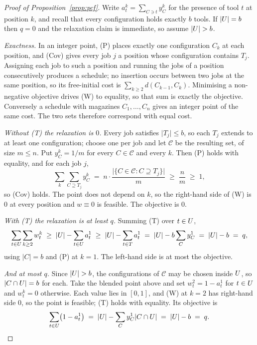 \begin{proof}[Proof of Proposition~\ref{prop:pcf}]
Write $a_t^{k}=\sum_{C\ni t}y_C^{k}$ for the presence of tool $t$ at position $k$, and
recall that every configuration holds exactly $b$ tools. If $\lvert U\rvert=b$ then
$q=0$ and the relaxation claim is immediate, so assume $\lvert U\rvert>b$.

\emph{Exactness.} In an integer point, (P) places exactly one configuration $C_k$ at
each position, and (Cov) gives every job $j$ a position whose configuration contains
$T_j$. Assigning each job to such a position and running the jobs of a position
consecutively produces a schedule; no insertion occurs between two jobs at the same
position, so its free-initial cost is $\sum_{k\ge2}d(C_{k-1},C_k)$. Minimising a
non-negative objective drives (W) to equality, so that sum is exactly the objective.
Conversely a schedule with magazines $C_1,\dots,C_n$ gives an integer point of the same
cost. The two sets therefore correspond with equal cost.

\emph{Without (T) the relaxation is $0$.} Every job satisfies $\lvert T_j\rvert\le b$,
so each $T_j$ extends to at least one configuration; choose one per job and let
$\mathcal{C}$ be the resulting set, of size $m\le n$. Put $y_C^{k}=1/m$ for every
$C\in\mathcal{C}$ and every $k$. Then (P) holds with equality, and for each job $j$,
\[
  \sum_{k}\sum_{C\supseteq T_j}y_C^{k}\;=\;n\cdot\frac{\lvert\{C\in\mathcal{C}:C\supseteq T_j\}\rvert}{m}\;\ge\;\frac{n}{m}\;\ge\;1,
\]
so (Cov) holds. The point does not depend on $k$, so the right-hand side of (W) is $0$
at every position and $w\equiv0$ is feasible. The objective is $0$.

\emph{With (T) the relaxation is at least $q$.} Summing (T) over $t\in U$,
\[
  \sum_{t\in U}\sum_{k\ge2}w_t^{k}\;\ge\;\lvert U\rvert-\sum_{t\in U}a_t^{1}
  \;\ge\;\lvert U\rvert-\sum_{t\in T}a_t^{1}
  \;=\;\lvert U\rvert-b\sum_{C}y_C^{1}\;=\;\lvert U\rvert-b\;=\;q,
\]
using $\lvert C\rvert=b$ and (P) at $k=1$. The left-hand side is at most the objective.

\emph{And at most $q$.} Since $\lvert U\rvert>b$, the configurations of $\mathcal{C}$
may be chosen inside $U$, so $\lvert C\cap U\rvert=b$ for each. Take the blended point
above and set $w_t^{2}=1-a_t^{1}$ for $t\in U$ and $w_t^{k}=0$ otherwise. Each value
lies in $[0,1]$, and (W) at $k=2$ has right-hand side $0$, so the point is feasible;
(T) holds with equality. Its objective is
\[
  \sum_{t\in U}\bigl(1-a_t^{1}\bigr)
  \;=\;\lvert U\rvert-\sum_{C}y_C^{1}\lvert C\cap U\rvert
  \;=\;\lvert U\rvert-b\;=\;q. \qedhere
\]
\end{proof}


